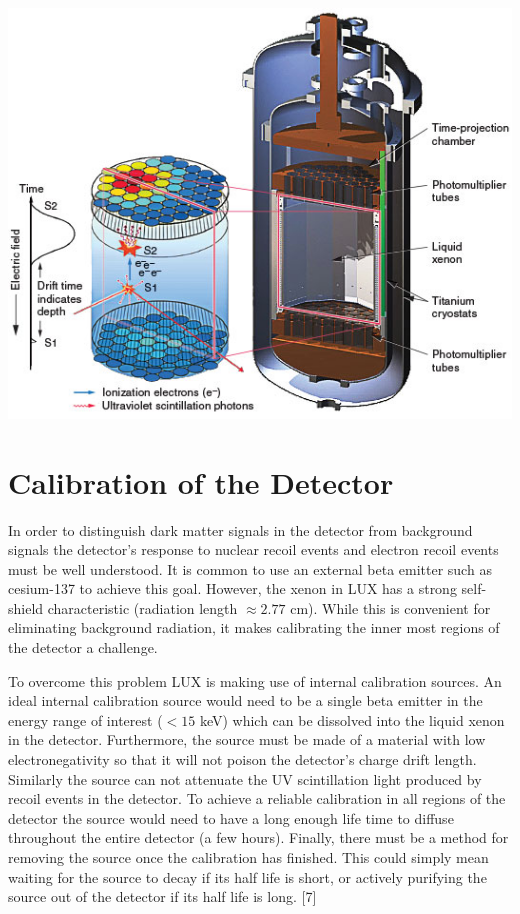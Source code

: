 \documentclass[a4paper,12pt]{article}
\begin{document}
\begin{center}
\includegraphics[scale=0.5]{lux.jpg}
\end{center}

\section{Calibration of the Detector}

In order to distinguish dark matter signals in the detector from background signals the detector's response to nuclear recoil events and electron recoil events must be well understood.  It is common to use an external beta emitter such as cesium-137 to achieve this goal.  However, the xenon in LUX has a strong self-shield characteristic (radiation length $ \approx 2.77 $ cm).  While this is convenient for eliminating background radiation, it makes calibrating the inner most regions of the detector a challenge.

To overcome this problem LUX is making use of internal calibration sources.  An ideal internal calibration source would need to be a single beta emitter in the energy range of interest ($ <15 $ keV) which can be dissolved into the liquid xenon in the detector.  Furthermore, the source must be made of a material with low electronegativity so that it will not poison the detector's charge drift length.  Similarly the source can not attenuate the UV scintillation light produced by recoil events in the detector.  To achieve a reliable calibration in all regions of the detector the source would need to have a long enough life time to diffuse throughout the entire detector (a few hours).  Finally, there must be a method for removing the source once the calibration has finished.  This could simply mean waiting for the source to decay if its half life is short, or actively purifying the source out of the detector if its half life is long. [7]
\end{document}
